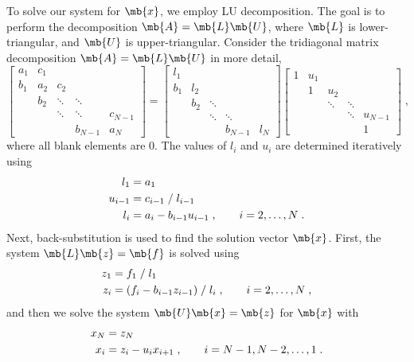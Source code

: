 \documentclass[11pt]{article}
\begin{document}
To solve our system for $\mb{x}$, we employ LU decomposition. The goal is to perform the decomposition $\mb{A} = \mb{L} \mb{U}$, where $\mb{L}$ is lower-triangular, and $\mb{U}$ is upper-triangular. Consider the tridiagonal matrix decomposition $\mb{A} = \mb{L} \mb{U}$ in more detail,
\begin{equation}
\begin{bmatrix}
a_1 & c_1 &        &         & \\
b_1 & a_2 & c_2    &         & \\
    & b_2 & \ddots & \ddots  & \\
    &     & \ddots & \ddots  & c_{N-1} \\
    &     &        & b_{N-1} & a_N
\end{bmatrix}
=
\begin{bmatrix}
l_1 &     &        &         & \\
b_1 & l_2 &        &         & \\
    & b_2 & \ddots &         & \\
    &     & \ddots & \ddots  & \\
    &     &        & b_{N-1} & l_N
\end{bmatrix}
\begin{bmatrix}
1 & u_1 &        &        & \\
  & 1   & u_2    &        & \\
  &     & \ddots & \ddots & \\
  &     &        & \ddots & u_{N-1} \\
  &     &        &        & 1
\end{bmatrix}
\;,
\end{equation}
where all blank elements are 0. The values of $l_i$ and $u_i$ are determined iteratively using
\begin{align}
l_1     &= a_1 \notag \\
u_{i-1} &= c_{i-1} \; / \; l_{i-1} \notag \\
l_i     &= a_i - b_{i-1} u_{i-1}
\;,
\qquad
i = 2, \dots, N
\;.
\end{align}
Next, back-substitution is used to find the solution vector $\mb{x}$. First, the system $\mb{L} \mb{z} = \mb{f}$ is solved using
\begin{align}
z_1 &= f_1 \; / \; l_1 \notag \\
z_i &= (f_i - b_{i-1} z_{i-1}) \; / \; l_i
\;,
\qquad
i = 2, \dots, N
\;,
\end{align}
and then we solve the system $\mb{U} \mb{x} = \mb{z}$ for $\mb{x}$ with
\begin{align}
x_N &= z_N \notag \\
x_i &= z_i - u_i x_{i+1}
\;,
\qquad
i = N-1, N-2, \dots, 1
\;.
\end{align}
\end{document}
